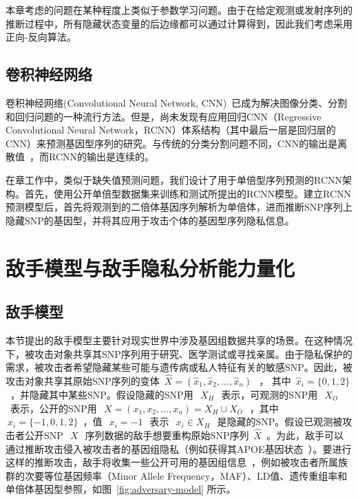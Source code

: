 本章考虑的问题在某种程度上类似于参数学习问题。由于在给定观测或发射序列的推断过程中，所有隐藏状态变量的后边缘都可以通过计算得到，因此我们考虑采用正向-反向算法。

\subsection{卷积神经网络}

卷积神经网络(Convolutional Neural Network, CNN)~\cite{long2017fully,scutti2018what}已成为解决图像分类、分割和回归问题的一种流行方法。但是，尚未发现有应用回归CNN（Regressive Convolutional Neural Network，RCNN）体系结构（其中最后一层是回归层的CNN）来预测基因型序列的研究。与传统的分类分割问题不同，CNN的输出是离散值~\cite{scutti2018what}，而RCNN的输出是连续的。

在章工作中，类似于缺失值预测问题，我们设计了用于单倍型序列预测的RCNN架构。首先，使用公开单倍型数据集来训练和测试所提出的RCNN模型。建立RCNN预测模型后，首先将观测到的二倍体基因序列解析为单倍体，进而推断SNP序列上隐藏SNP的基因型，并将其应用于攻击个体的基因型序列隐私信息。


\section{敌手模型与敌手隐私分析能力量化}\label{sec:adver}

\subsection{敌手模型}

本节提出的敌手模型主要针对现实世界中涉及基因组数据共享的场景。在这种情况下，被攻击对象共享其SNP序列用于研究、医学测试或寻找亲属。由于隐私保护的需求，被攻击者希望隐藏某些可能与遗传病或私人特征有关的敏感SNP。因此，被攻击对象共享其原始SNP序列的变体~$\hat{X}=(\hat{x}_1,\hat{x}_2, ... , \hat{x}_n)~$~， 其中~$\hat{x}_i =\{0,1,2\}$~，并隐藏其中某些SNP。假设隐藏的SNP用~$~X_H~$~表示，可观测的SNP用~$~X_O~$~表示，公开的SNP用~$~X=(x_1, x_2, ..., x_n)=X_H \cup X_O~$~，其中~$~x_i =\{-1,0,1,2\}$~，值~$~x_i=-1~$~表示~$~x_i\in X_H~$~是隐藏的SNP。假设已观测被攻击者公开SNP~$~X~$~序列数据的敌手想要重构原始SNP序列~$\hat{X}$~。为此，敌手可以通过推断攻击侵入被攻击者的基因组隐私（例如获得其APOE基因状态~\cite{nyholt2009jim}）。要进行这样的推断攻击，敌手将收集一些公开可用的基因组信息~\cite{IGSR2019,howie2014impute2}，例如被攻击者所属族群的次要等位基因频率（Minor Allele Frequency，MAF）、LD值、遗传重组率和单倍体基因型参照，如图~\ref{fig:adversary-model} 所示。

